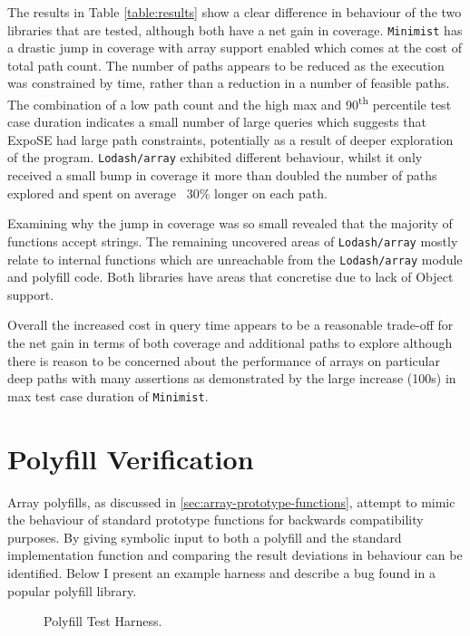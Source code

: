\documentclass[]{final_report}
\begin{document}
The results in Table \ref{table:results} show a clear difference in behaviour of the two libraries that are tested, although both have a net gain in coverage. \lstinline|Minimist| has a drastic jump in coverage with array support enabled which comes at the cost of total path count. The number of paths appears to be reduced as the execution was constrained by time, rather than a reduction in a number of feasible paths. The combination of a low path count and the high max and 90\textsuperscript{th} percentile test case duration indicates a small number of large queries which suggests that ExpoSE had large path constraints, potentially as a result of deeper exploration of the program. \lstinline|Lodash/array| exhibited different behaviour, whilst it only received a small bump in coverage it more than doubled the number of paths explored and spent on average ~30\% longer on each path. 

Examining why the jump in coverage was so small revealed that the majority of functions accept strings. The remaining uncovered areas of \lstinline|Lodash/array| mostly relate to internal functions which are unreachable from the \lstinline|Lodash/array| module and polyfill code. Both libraries have areas that concretise due to lack of Object support.

Overall the increased cost in query time appears to be a reasonable trade-off for the net gain in terms of both coverage and additional paths to explore although there is reason to be concerned about the performance of arrays on particular deep paths with many assertions as demonstrated by the large increase (100s) in max test case duration of \lstinline|Minimist|.

\section{Polyfill Verification}
Array polyfills, as discussed in \ref{sec:array-prototype-functions}, attempt to mimic the behaviour of standard prototype functions for backwards compatibility purposes. By giving symbolic input to both a polyfill and the standard implementation function and comparing the result deviations in behaviour can be identified. Below I present an example harness and describe a bug found in a popular polyfill library.

\begin{figure}[t]

\caption{\label{fig:polyfill-test-harness} Polyfill Test Harness.}
\end{figure}
\end{document}
